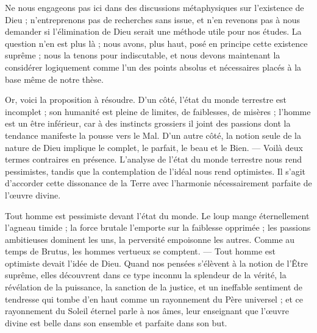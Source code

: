 \documentclass[a4paper, 11pt, oneside]{article}
\begin{document}
Ne nous engageons pas ici dans des discussions métaphysiques sur l'existence de Dieu ; n'entreprenons pas de recherches sans issue, et n'en revenons pas à nous demander si l'élimination de Dieu serait une méthode utile pour nos études. La question n'en est plus là ; nous avons, plus haut, posé en principe cette existence suprême ; nous la tenons pour indiscutable, et nous devons maintenant la considérer logiquement comme l'un des points absolus et nécessaires placés à la base même de notre thèse.

Or, voici la proposition à résoudre. D'un côté, l'état du monde terrestre est incomplet ; son humanité est pleine de limites, de faiblesses, de misères ; l'homme est un être inférieur, car à des instincts grossiers il joint des passions dont la tendance manifeste la pousse vers le Mal. D'un autre côté, la notion seule de la nature de Dieu implique le complet, le parfait, le beau et le Bien. --- Voilà deux termes contraires en présence. L'analyse de l'état du monde terrestre nous rend pessimistes, tandis que la contemplation de l'idéal nous rend optimistes. Il s'agit d'accorder cette dissonance de la Terre avec l'harmonie nécessairement parfaite de l'œuvre divine.

Tout homme est pessimiste devant l'état du monde. Le loup mange éternellement l'agneau timide ; la force brutale l'emporte sur la faiblesse opprimée ; les passions ambitieuses dominent les uns, la perversité empoisonne les autres. Comme au temps de Brutus, les hommes vertueux se comptent. --- Tout homme est optimiste devait l'idée de Dieu. Quand nos pensées s'élèvent à la notion de l'Être suprême, elles découvrent dans ce type inconnu la splendeur de la vérité, la révélation de la puissance, la sanction de la justice, et un ineffable sentiment de tendresse qui tombe d'en haut comme un rayonnement du Père universel ; et ce rayonnement du Soleil éternel parle à nos âmes, leur enseignant que l'œuvre divine est belle dans son ensemble et parfaite dans son but.
\end{document}
